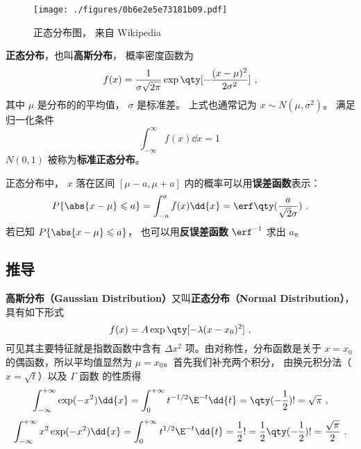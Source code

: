 
\begin{issues}
\issueTODO
\end{issues}


\begin{figure}[ht]
\centering
\texttt{[image: ./figures/0b6e2e5e73181b09.pdf]}
\caption{正态分布图， 来自 Wikipedia} \label{fig_GausPD_1}
\end{figure}

\textbf{正态分布}，也叫\textbf{高斯分布}， 概率密度函数为
\begin{equation}\label{eq_GausPD_1}
f(x) = \frac{1}{\sigma \sqrt{2\pi }} \exp\qty[-\frac{(x - \mu )^2}{2\sigma ^2}]~,
\end{equation}
其中 $\mu$ 是分布的的平均值， $\sigma$ 是标准差。 上式也通常记为 $x \sim N(\mu,\sigma^2)$。 满足归一化条件
\begin{equation}
\int_{-\infty}^{\infty} f(x) \dd{x} = 1~
\end{equation}
$N(0,1)$ 被称为\textbf{标准正态分布}。

正态分布中， $x$ 落在区间 $[\mu-a,\mu+a]$ 内的概率可以用\textbf{误差函数}表示：
\begin{equation}
P\{\abs{x-\mu} \leqslant a\} = \int_{-a}^a f(x)\dd{x} = \erf\qty(\frac{a}{\sqrt{2}\sigma})~.
\end{equation}
若已知 $P\{\abs{x-\mu} \leqslant a\}$， 也可以用\textbf{反误差函数} $\erf^{-1}$ 求出 $a$。


\subsection{推导}
\textbf{高斯分布（Gaussian Distribution）}又叫\textbf{正态分布（Normal Distribution）}， 具有如下形式
\begin{equation}\label{eq_GausPD_2}
f(x) = A\exp\qty[-\lambda (x - x_0)^2]~,
\end{equation}
可见其主要特征就是指数函数中含有 $\Delta x^2$ 项。由对称性，分布函数是关于 $x =x_0$ 的偶函数，所以平均值显然为 $\mu = x_0$。首先我们补充两个积分， 由换元积分法（$x=\sqrt{t}$）以及 $\Gamma$ 函数 的性质得
\begin{equation}\label{eq_GausPD_3}
\int_{-\infty }^{+\infty } \exp (-x^2)\dd{x}  = \int_0^{+\infty} t^{-1/2}\E^{ - t} \dd{t}  = \qty(-\frac12)! = \sqrt \pi ~,
\end{equation}
\begin{equation}\label{eq_GausPD_4}
\int_{-\infty}^{+\infty} x^2\exp(-x^2)\dd{x}  = \int_0^{+\infty} t^{1/2}\E^{-t} \dd{t}  = \frac12 ! = \frac12 \qty(-\frac12)! = \frac{\sqrt\pi}{2}~.
\end{equation}

